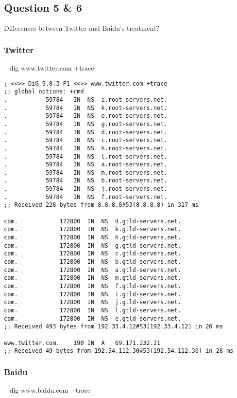 \documentclass{article}
\begin{document}
\subsection*{Question 5 \& 6}

Differences between Twitter and Baidu's treatment?

\subsubsection*{Twitter}

~ dig www.twitter.com +trace

\begin{lstlisting}[numberstyle=\tiny\monaco,
        basicstyle=\small\monaco]
; <<>> DiG 9.8.3-P1 <<>> www.twitter.com +trace
;; global options: +cmd
.			59784	IN	NS	i.root-servers.net.
.			59784	IN	NS	k.root-servers.net.
.			59784	IN	NS	e.root-servers.net.
.			59784	IN	NS	g.root-servers.net.
.			59784	IN	NS	d.root-servers.net.
.			59784	IN	NS	c.root-servers.net.
.			59784	IN	NS	h.root-servers.net.
.			59784	IN	NS	l.root-servers.net.
.			59784	IN	NS	a.root-servers.net.
.			59784	IN	NS	m.root-servers.net.
.			59784	IN	NS	b.root-servers.net.
.			59784	IN	NS	j.root-servers.net.
.			59784	IN	NS	f.root-servers.net.
;; Received 228 bytes from 8.8.8.8#53(8.8.8.8) in 317 ms

com.			172800	IN	NS	d.gtld-servers.net.
com.			172800	IN	NS	k.gtld-servers.net.
com.			172800	IN	NS	h.gtld-servers.net.
com.			172800	IN	NS	g.gtld-servers.net.
com.			172800	IN	NS	c.gtld-servers.net.
com.			172800	IN	NS	b.gtld-servers.net.
com.			172800	IN	NS	a.gtld-servers.net.
com.			172800	IN	NS	m.gtld-servers.net.
com.			172800	IN	NS	f.gtld-servers.net.
com.			172800	IN	NS	i.gtld-servers.net.
com.			172800	IN	NS	j.gtld-servers.net.
com.			172800	IN	NS	l.gtld-servers.net.
com.			172800	IN	NS	e.gtld-servers.net.
;; Received 493 bytes from 192.33.4.12#53(192.33.4.12) in 26 ms

www.twitter.com.	190	IN	A	69.171.232.21
;; Received 49 bytes from 192.54.112.30#53(192.54.112.30) in 28 ms

\end{lstlisting}

\subsubsection*{Baidu}

~ dig www.baidu.com +trace
\end{document}
